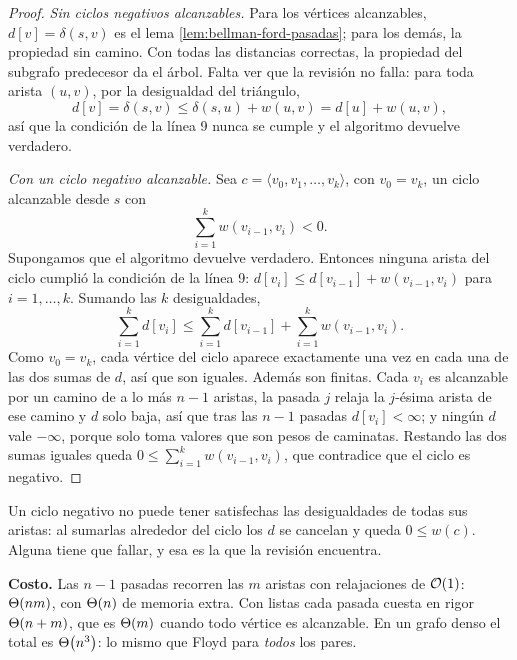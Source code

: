 \documentclass[11pt,letterpaper]{article}
\begin{document}
\begin{proof}
  \textit{Sin ciclos negativos alcanzables.} Para los vértices
  alcanzables, $d[v] = \delta(s, v)$ es el lema
  \ref{lem:bellman-ford-pasadas}; para los demás, la propiedad sin
  camino. Con todas las distancias correctas, la propiedad del
  subgrafo predecesor da el árbol. Falta ver que la revisión no
  falla: para toda arista $(u, v)$, por la desigualdad del triángulo,
  \[
    d[v] = \delta(s, v) \le \delta(s, u) + w(u, v)
         = d[u] + w(u, v) ,
  \]
  así que la condición de la línea 9 nunca se cumple y el algoritmo
  devuelve verdadero.

  \textit{Con un ciclo negativo alcanzable.} Sea
  $c = \langle v_0, v_1, \dots, v_k\rangle$, con $v_0 = v_k$, un ciclo
  alcanzable desde $s$ con
  \[
    \sum_{i=1}^{k} w(v_{i-1}, v_i) < 0 .
  \]
  Supongamos que el algoritmo devuelve verdadero. Entonces ninguna
  arista del ciclo cumplió la condición de la línea 9:
  $d[v_i] \le d[v_{i-1}] + w(v_{i-1}, v_i)$ para $i = 1, \dots, k$.
  Sumando las $k$ desigualdades,
  \[
    \sum_{i=1}^{k} d[v_i] \le \sum_{i=1}^{k} d[v_{i-1}]
      + \sum_{i=1}^{k} w(v_{i-1}, v_i) .
  \]
  Como $v_0 = v_k$, cada vértice del ciclo aparece exactamente una vez
  en cada una de las dos sumas de $d$, así que son iguales. Además
  son finitas. Cada $v_i$ es alcanzable por un camino de a lo más
  $n - 1$ aristas, la pasada $j$ relaja la $j$-ésima arista de ese
  camino y $d$ solo baja, así que tras las $n - 1$ pasadas
  $d[v_i] < \infty$; y ningún $d$ vale $-\infty$, porque solo toma
  valores que son pesos de caminatas. Restando las dos sumas iguales
  queda $0 \le \sum_{i=1}^{k} w(v_{i-1}, v_i)$, que contradice que el
  ciclo es negativo.
\end{proof}

Un ciclo negativo no puede tener satisfechas las desigualdades de
todas sus aristas: al sumarlas alrededor del ciclo los $d$ se cancelan
y queda $0 \le w(c)$. Alguna tiene que fallar, y esa es la que la
revisión encuentra.

\textbf{Costo.} Las $n - 1$ pasadas recorren las $m$ aristas con
relajaciones de $\mathcal{O}\!\left(1\right)$: $\Theta\!\left(nm\right)$, con $\Theta\!\left(n\right)$ de memoria extra.
Con listas cada pasada cuesta en rigor $\Theta\!\left(n + m\right)$, que es $\Theta\!\left(m\right)$
cuando todo vértice es alcanzable. En un grafo denso el total es
$\Theta\!\left(n^3\right)$: lo mismo que Floyd para \emph{todos} los pares.
\end{document}
